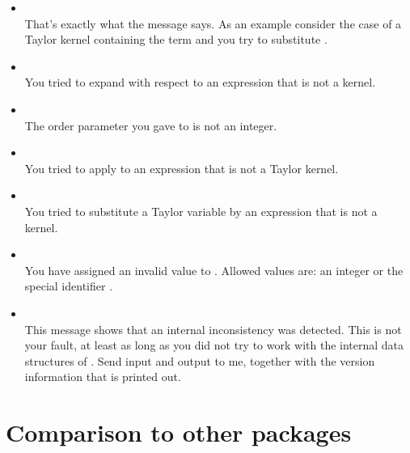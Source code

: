 \begin{itemize}
\item {}\\
    That's exactly what the message says.  As an example consider the
    case of a Taylor kernel containing the term  and you try
    to substitute .

\item {}\\
    You tried to expand with respect to an expression that is not a
    kernel.

\item {}\\
    The order parameter you gave to  is not an integer.

\item {}\\
 
    You tried to apply 
    to an expression that is not a Taylor kernel.

\item {}\\
    You tried to substitute a Taylor variable by an expression that is
    not a kernel.

\item {}\\
    You have assigned an invalid value to .
    Allowed values are: an integer or the special identifier
    .

\item {}\\
    This message shows that an internal inconsistency was detected.
    This is not your fault, at least as long as you did not try to
    work with the internal data structures of \REDUCE. Send input
    and output to me, together with the version information that is
    printed out.

\end{itemize}

\section{Comparison to other packages}

